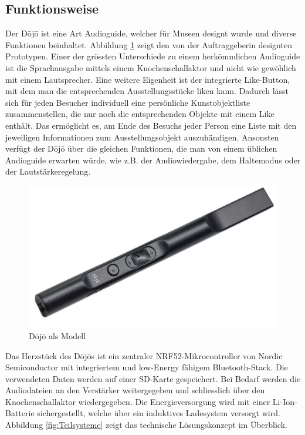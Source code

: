 \subsection{Funktionsweise} \label{sec:funktionsweise}
Der Dōjō ist eine Art Audioguide, welcher für Museen designt wurde und diverse Funktionen beinhaltet. Abbildung \ref{fig:Funktion Dojo} zeigt den von der Auftraggeberin designten Prototypen. Einer der grössten Unterschiede zu einem herkömmlichen Audioguide ist die Sprachausgabe mittels einem Knochenschallaktor und nicht wie gewöhlich mit einem Lautsprecher. Eine weitere Eigenheit ist der integrierte {\glqq Like\grqq}-Button, mit dem man die entsprechenden Ausstellungsstücke {\glqq liken\grqq} kann. Dadurch lässt sich für jeden Besucher individuell eine persönliche Kunstobjektliste zusammenstellen, die nur noch die entsprechenden Objekte mit einem {\glqq Like\grqq} enthält. Das ermöglicht es, am Ende des Besuchs jeder Person eine Liste mit den jeweiligen Informationen zum Ausstellungsobjekt auszuhändigen. Ansonsten verfügt der Dōjō über die gleichen Funktionen, die man von einem üblichen Audioguide erwarten würde, wie z.B. der Audiowiedergabe, dem Haltemodus oder der Lautstärkeregelung.

\begin{figure}[H]
	\begin{center}
		\includegraphics[width=120mm]{data/Dojo.png}
		\caption[Dōjō als Modell]{Dōjō als Modell} %
		\label{fig:Funktion Dojo}
	\end{center}
\end{figure}

Das Herzstück des Dōjōs ist ein zentraler NRF52-Mikrocontroller von Nordic Semiconductor mit integriertem und low-Energy fähigem Bluetooth-Stack. Die verwendeten Daten werden auf einer SD-Karte gespeichert. Bei Bedarf werden die Audiodateien an den Verstärker weitergegeben und schliesslich über den Knochenschallaktor wiedergegeben. Die Energieversorgung wird mit einer Li-Ion-Batterie sichergestellt, welche über ein induktives Ladesystem versorgt wird. Abbildung \ref{fig:Teilsysteme} zeigt das technische Lösungskonzept im Überblick.

